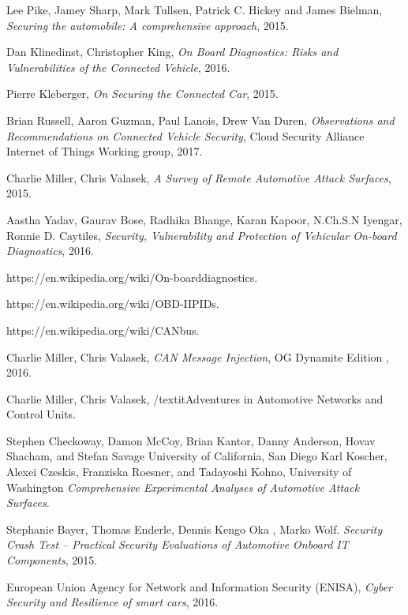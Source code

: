 \documentclass[11pt]{article}
\begin{document}
\begin{thebibliography}{10}
	
	Lee Pike, Jamey Sharp, Mark Tullsen, Patrick C. Hickey and James Bielman, \textit{Securing the automobile: A comprehensive approach}, 2015.
	
	Dan Klinedinst, Christopher King, 
	\textit{On Board Diagnostics: Risks and Vulnerabilities of the Connected Vehicle}, 2016.
	
	Pierre Kleberger, \textit{On Securing the Connected Car},
	2015.
	
	Brian Russell, Aaron Guzman, Paul Lanois, Drew Van Duren,
	\textit{Observations and Recommendations on Connected Vehicle Security},
	Cloud Security Alliance Internet of Things Working group, 2017.
	
	Charlie Miller, Chris Valasek,
	\textit{A Survey of Remote Automotive Attack Surfaces}, 2015.
	
	Aastha Yadav, Gaurav Bose, Radhika Bhange, Karan Kapoor, N.Ch.S.N Iyengar, Ronnie D. Caytiles, \textit{Security, Vulnerability and Protection of Vehicular On-board Diagnostics}, 2016.
	
	https://en.wikipedia.org/wiki/On-board\textunderscore diagnostics.
	
	https://en.wikipedia.org/wiki/OBD-II\textunderscore PIDs.
	
	https://en.wikipedia.org/wiki/CAN\textunderscore bus.
	
	Charlie Miller, Chris Valasek,
	\textit{CAN Message Injection},
	OG Dynamite Edition
	, 2016.
	
	Charlie Miller, Chris Valasek,
	/textit{Adventures in Automotive Networks and Control Units}.
	
	Stephen Checkoway, Damon McCoy, Brian Kantor, Danny Anderson, Hovav Shacham, and Stefan Savage University of California, San Diego
	Karl Koscher, Alexei Czeskis, Franziska Roesner, and Tadayoshi Kohno,
	University of Washington
	\textit{Comprehensive Experimental Analyses of Automotive Attack Surfaces}.
	
	Stephanie Bayer, Thomas Enderle, Dennis Kengo Oka , Marko Wolf.
	\textit{Security Crash Test – Practical Security Evaluations of Automotive Onboard IT Components}, 2015.
	
	European Union Agency for Network and Information Security (ENISA),
	\textit{Cyber Security and Resilience of smart cars},
	2016.
	

\end{thebibliography}
\end{document}
